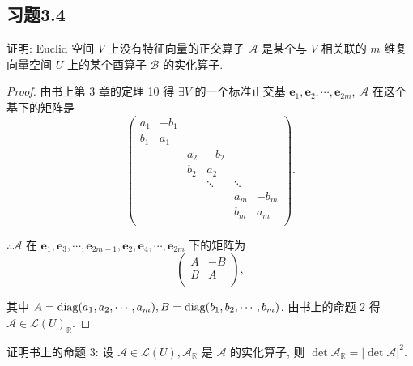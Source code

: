 \documentclass{ctexart}
\begin{document}
\subsection{习题3.4}
\begin{exercise}%
    证明: Euclid 空间 $V$ 上没有特征向量的正交算子 $\mathcal{A}$ 是某个与 $V$ 相关联的 $m$ 维复向量空间 $U$ 上的某个酉算子 $\mathcal{B}$ 的实化算子.
\end{exercise}
\begin{proof}
    由书上第 3 章的定理 10 得 $\exists V$ 的一个标准正交基 $\boldsymbol{e}_1,\boldsymbol{e}_2,\cdots,\boldsymbol{e}_{2m}$, $\mathcal{A}$ 在这个基下的矩阵是
    \[\begin{pmatrix}
        a_1 & -b_1 \\
        b_1 & a_1 \\
        && a_2 & -b_2 \\
        && b_2 & a_2 \\
        &&& \ddots & \ddots \\
        &&&& a_m & -b_m \\
        &&&& b_m & a_m \\
    \end{pmatrix}.\]

    $\therefore\mathcal{A}$ 在 $\boldsymbol{e}_1,\boldsymbol{e}_3,\cdots,\boldsymbol{e}_{2m-1},\boldsymbol{e}_2,\boldsymbol{e}_4,\cdots,\boldsymbol{e}_{2m}$ 下的矩阵为
    \[\begin{pmatrix}
        A & -B \\
        B & A \\
    \end{pmatrix},\]

    其中 $A=\operatorname{diag} (a_1,a_2,\cdots,a_m),B=\operatorname{diag} (b_1,b_2,\cdots,b_m)$. 由书上的命题 2 得 $\mathcal{A}\in\mathcal{L}(U)_\mathbb{R}$.
\end{proof}
\begin{exercise}%
    证明书上的命题 3: 设 $\mathcal{A}\in\mathcal{L}(U),\mathcal{A}_\mathbb{R}$ 是 $\mathcal{A}$ 的实化算子, 则 $\det\mathcal{A}_\mathbb{R}=|\det\mathcal{A}|^2$.
\end{exercise}
\end{document}

